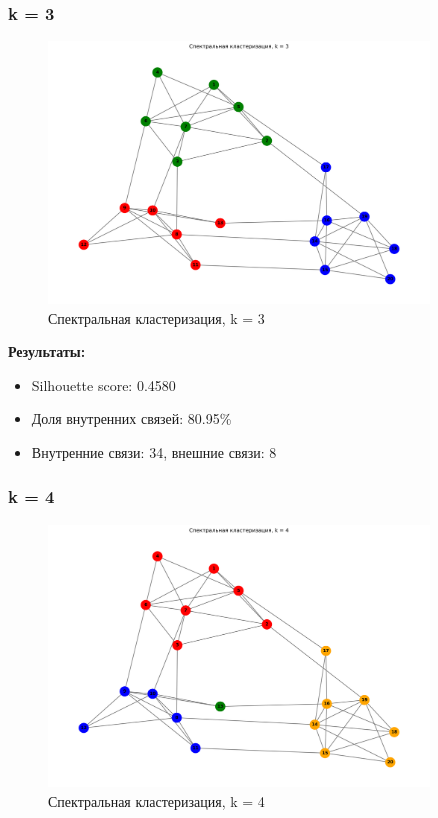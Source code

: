 \subsubsection*{k = 3}

\begin{figure}[H]
    \centering
    \includegraphics[width=0.9\textwidth]{images/task1/clustering_k3.png}
    \caption{Спектральная кластеризация, k = 3}
\end{figure}

\textbf{Результаты:}
\begin{itemize}
    \item Silhouette score: 0.4580
    \item Доля внутренних связей: 80.95\%
    \item Внутренние связи: 34, внешние связи: 8
\end{itemize}

\subsubsection*{k = 4}

\begin{figure}[H]
    \centering
    \includegraphics[width=0.9\textwidth]{images/task1/clustering_k4.png}
    \caption{Спектральная кластеризация, k = 4}
\end{figure}

